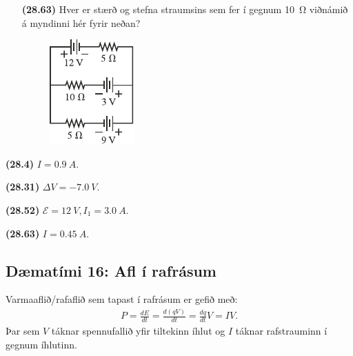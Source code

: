 \begin{enumerate}[label = \textbf{(\alph*)}]
\item[\textbf{(28.63)}] Hver er stærð og stefna straumsins sem fer í gegnum \SI{10}{\ohm} viðnámið á myndinni hér fyrir neðan?

\begin{figure}[H]
    \centering
    \includegraphics[scale = 1.2]{figures/rk2863.pdf}
\end{figure}

\end{enumerate}

\begin{tcolorbox}
\begin{enumerate*}[label = ]
  \item \textbf{(28.4)} $I = \SI{0.9}{A}$.
  \item \textbf{(28.31)} $\Delta V = -\SI{7.0}{V}$.
  \item \textbf{(28.52)} $\mathcal{E} = \SI{12}{V}, I_1 = \SI{3.0}{A}$.
  \item \textbf{(28.63)} $I = \SI{0.45}{A}$.
\end{enumerate*}
\end{tcolorbox}

\newpage

\subsection*{Dæmatími 16: Afl í rafrásum}

\begin{tcolorbox}
Varmaaflið/rafaflið sem tapast í rafrásum er gefið með:
\begin{align*}
    P = \frac{dE}{dt} = \frac{d\left(qV \right)}{dt} = \frac{dq}{dt}V = IV.
\end{align*}
Þar sem $V$ táknar spennufallið yfir tiltekinn íhlut og $I$ táknar rafstrauminn í gegnum íhlutinn.
\end{tcolorbox}


